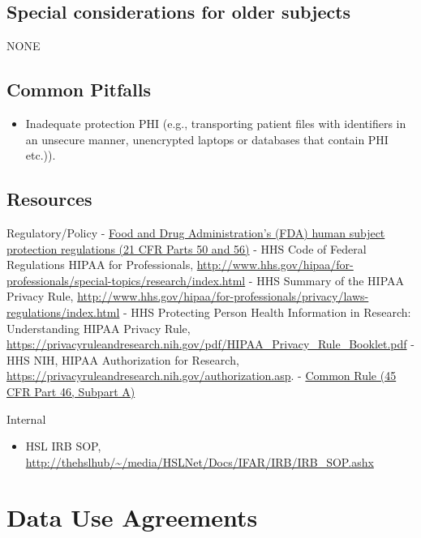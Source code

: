 \documentclass[]{book}
\providecommand{\tightlist}{%
  \setlength{\itemsep}{0pt}\setlength{\parskip}{0pt}}
\begin{document}
\subsection{Special considerations for older
subjects}\label{special-considerations-for-older-subjects-1}

NONE

\subsection{Common Pitfalls}\label{common-pitfalls-4}

\begin{itemize}
\tightlist
\item
  Inadequate protection PHI (e.g., transporting patient files with
  identifiers in an unsecure manner, unencrypted laptops or databases
  that contain PHI etc.)).
\end{itemize}

\subsection{Resources}\label{resources-5}

Regulatory/Policy -
\href{http://osp.od.nih.gov/office-clinical-research-and-bioethics-policy/clinical-research-policy/research-involving-human-subjects}{Food
and Drug Administration's (FDA) human subject protection regulations (21
CFR Parts 50 and 56)} - HHS Code of Federal Regulations HIPAA for
Professionals,
\url{http://www.hhs.gov/hipaa/for-professionals/special-topics/research/index.html}
- HHS Summary of the HIPAA Privacy Rule,
\url{http://www.hhs.gov/hipaa/for-professionals/privacy/laws-regulations/index.html}
- HHS Protecting Person Health Information in Research: Understanding
HIPAA Privacy Rule,
\url{https://privacyruleandresearch.nih.gov/pdf/HIPAA_Privacy_Rule_Booklet.pdf}
- HHS NIH, HIPAA Authorization for Research,
\url{https://privacyruleandresearch.nih.gov/authorization.asp}. -
\href{http://www.hhs.gov/ohrp/regulations-and-policy/regulations/common-rule/}{Common
Rule (45 CFR Part 46, Subpart A)}

Internal

\begin{itemize}
\tightlist
\item
  HSL IRB SOP,
  \url{http://thehslhub/~/media/HSLNet/Docs/IFAR/IRB/IRB_SOP.ashx}
\end{itemize}

\section{Data Use Agreements}\label{data-use-agreements}
\end{document}
